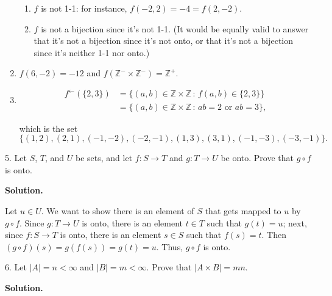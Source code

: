\documentclass[10pt,]{book}
\theoremstyle{plain}
\theoremstyle{definition}
\theoremstyle{definition}
\theoremstyle{definition}
\theoremstyle{definition}
\numberwithin{equation}{section}
\def\Z{\mathbb{Z}}
\newcommand{\lt}{ < }
\newcommand{\amp}{ & }
\begin{document}
\begin{exerciselist}
\begin{enumerate}[label=(\alph*)]
\begin{enumerate}[label=\roman*.]
\item\hypertarget{li-49}{}
            \(f\) is not 1-1: for instance, \(f(-2,2)=-4=f(2,-2)\).
\item\hypertarget{li-50}{}
            \(f\) is not a bijection since it's not 1-1. (It would be equally valid to answer that it's not a bijection since it's not onto, or that it's not a bijection since it's neither 1-1 nor onto.)
\end{enumerate}
%
\item\hypertarget{li-51}{}
        \(f(6,-2)=-12\) and \(f(\Z^-\times \Z^-)=\Z^+\).
\item\hypertarget{li-52}{}
\begin{align*}
f^{\leftarrow}(\{2,3\})\amp =\{(a,b)\in \Z\times \Z\,:\, f(a,b)\in \{2,3\}\}\\
\amp =\{(a,b)\in \Z\times \Z\,:\, ab=2 \mbox{ or }  ab=3\},
\end{align*}

        which is the set
\begin{equation*}

          \{(1,2),(2,1),(-1,-2),(-2,-1),(1,3),(3,1),(-1,-3),(-3,-1)\}.
        
\end{equation*}

\end{enumerate}
\item[5.]\hypertarget{exercise-5}{}
        Let \(S\), \(T\), and \(U\) be sets, and let \(f: S\to T\) and \(g: T\to U\) be onto. Prove that \(g \circ f\) is onto.
\par\smallskip
\par\smallskip
\noindent\textbf{Solution.}\hypertarget{solution-5}{}\quad

      Let \(u\in U\). We want to show there is an element of \(S\) that gets mapped to \(u\) by \(g\circ f\). Since \(g:T\to U\) is onto, there is an element \(t\in T\) such that \(g(t)=u\); next, since \(f:S\to T\) is onto, there is an element \(s\in S\) such that \(f(s)=t\). Then \((g\circ f)(s)=g(f(s))=g(t)=u\). Thus, \(g\circ f\) is onto.
\item[6.]\hypertarget{exercise-6}{}
        Let \(|A|=n\lt \infty\) and \(|B|=m\lt  \infty\). Prove that \(|A\times B|=mn\).
\par\smallskip
\par\smallskip
\noindent\textbf{Solution.}\hypertarget{solution-6}{}\quad


\end{exerciselist}
\end{document}
